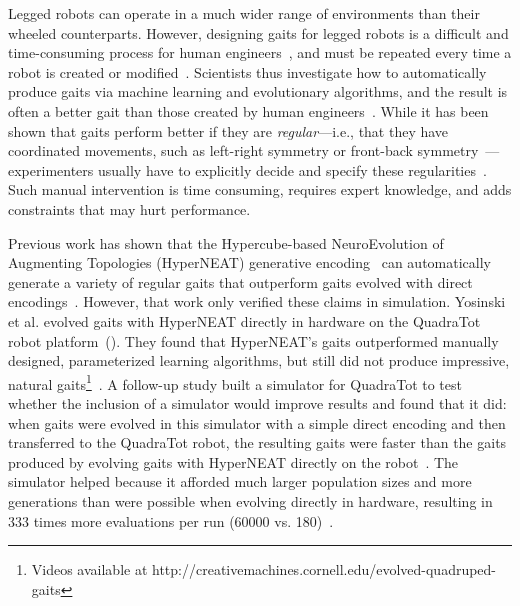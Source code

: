 
Legged robots can operate in a much wider range of environments than their wheeled counterparts. However, designing gaits for legged robots is a difficult and time-consuming process for human engineers~\cite{strom1999legged,wettergreen1992gait}, and must be repeated every time a robot is created or modified~\cite{hornby2005autonomous}. 
Scientists thus investigate how to automatically produce gaits via machine learning and evolutionary algorithms, and the result is often a better gait than those created by human engineers~\cite{valsalam:mii,kohl:stone,hornby2005autonomous,hornby2003generative,yos:clune}. While it has been shown that gaits perform better if they are \emph{regular}---i.e., that they have coordinated movements, such as left-right symmetry or front-back symmetry~\cite{valsalam:mii,clune2011performance,clune2009evolving,clune2009sensitivity}---experimenters usually have to explicitly decide and specify these regularities~\cite{valsalam:mii,tellez,beer,raibert}. 
Such manual intervention is time consuming, requires expert knowledge, and adds constraints that may hurt performance. 

Previous work has shown that the Hypercube-based NeuroEvolution of Augmenting Topologies (HyperNEAT) generative encoding~\cite{stanley2009hypercube} can automatically generate a variety of regular gaits that outperform gaits evolved with direct encodings~\cite{clune2009evolving,clune2011performance}.
However, that work only verified these claims in simulation. 
Yosinski et al. evolved gaits with HyperNEAT directly in hardware on the QuadraTot robot platform~(). They found that HyperNEAT's gaits outperformed manually designed, parameterized learning algorithms, but still did not produce impressive, natural gaits\footnote{Videos available at http://creativemachines.cornell.edu/evolved-quadruped-gaits}~\cite{yos:clune}. 
A follow-up study built a simulator for QuadraTot to test whether the inclusion of a simulator would improve results and found that it did:  when gaits were evolved in this simulator with a simple direct encoding and then transferred to the QuadraTot robot, the resulting gaits were faster than the gaits produced by evolving gaits with HyperNEAT directly on the robot~\cite{glette}. 
The simulator helped because it afforded much larger population sizes and more generations than were possible when evolving directly in hardware, resulting in 333 times more evaluations per run (60000 vs. 180)~\cite{yos:clune,glette}. 

